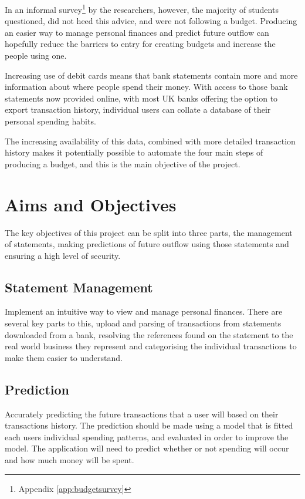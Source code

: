 In an informal survey\footnote{Appendix \ref{app:budgetsurvey}} by the researchers, however, the majority of students questioned, did not heed this advice, and were not following a budget. Producing an easier way to manage personal finances and predict future outflow can hopefully reduce the barriers to entry for creating budgets and increase the people using one.

Increasing use of debit cards \parencite{bbc2010debit} means that bank statements contain more and more information about where people spend their money. With access to those bank statements now provided online, with most UK banks offering the option to export \gls{transaction} history, individual users can collate a database of their personal spending habits.

The increasing availability of this data, combined with more detailed \gls{transaction} history makes it potentially possible to automate the four main steps of producing a budget, and this is the main objective of the project.

\section{Aims and Objectives}
The key objectives of this project can be split into three parts, the management of statements, making predictions of future outflow using those statements and ensuring a high level of security.

\subsection{Statement Management}
Implement an intuitive way to view and manage personal finances.
%
There are several key parts to this, upload and parsing of \glspl{transaction} from statements downloaded from a bank, resolving the \glspl{reference} found on the statement to the real world business they represent and categorising the individual \glspl{transaction} to make them easier to understand. 
    
\subsection{Prediction}
Accurately predicting the future \glspl{transaction} that a user will based on their \glspl{transaction} history.
%
The prediction should be made using a model that is fitted each users individual spending patterns, and evaluated in order to improve the model.
%
The application will need to predict whether or not spending will occur and how much money will be spent.

